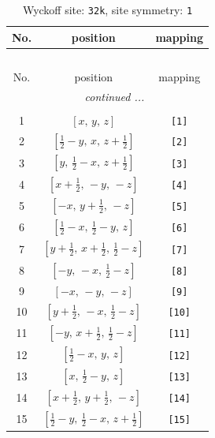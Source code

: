 \documentclass[fleqn,8pt]{jsarticle}
\begin{document}
\renewcommand{\arraystretch}{1.2}
\begin{longtable}{ccc}
\caption{Wyckoff site: {\tt 32k}, site symmetry: {\tt 1}}
 \\
 \hline \hline
No. & position & mapping \\ \hline \endfirsthead

\multicolumn{2}{l}{\tablename\ \thetable{}} \\
 \hline \hline
No. & position & mapping \\ \hline \endhead

 \hline \hline
\multicolumn{2}{r}{\footnotesize\it continued ...} \\ \endfoot

 \hline \hline
\multicolumn{2}{r}{} \\ \endlastfoot

1 & $\left[ x,\, y,\, z \right]$ & {\tt [1]} \\ \hline
2 & $\left[ \frac{1}{2} - y,\, x,\, z + \frac{1}{2} \right]$ & {\tt [2]} \\ \hline
3 & $\left[ y,\, \frac{1}{2} - x,\, z + \frac{1}{2} \right]$ & {\tt [3]} \\ \hline
4 & $\left[ x + \frac{1}{2},\, - y,\, - z \right]$ & {\tt [4]} \\ \hline
5 & $\left[ - x,\, y + \frac{1}{2},\, - z \right]$ & {\tt [5]} \\ \hline
6 & $\left[ \frac{1}{2} - x,\, \frac{1}{2} - y,\, z \right]$ & {\tt [6]} \\ \hline
7 & $\left[ y + \frac{1}{2},\, x + \frac{1}{2},\, \frac{1}{2} - z \right]$ & {\tt [7]} \\ \hline
8 & $\left[ - y,\, - x,\, \frac{1}{2} - z \right]$ & {\tt [8]} \\ \hline
9 & $\left[ - x,\, - y,\, - z \right]$ & {\tt [9]} \\ \hline
10 & $\left[ y + \frac{1}{2},\, - x,\, \frac{1}{2} - z \right]$ & {\tt [10]} \\ \hline
11 & $\left[ - y,\, x + \frac{1}{2},\, \frac{1}{2} - z \right]$ & {\tt [11]} \\ \hline
12 & $\left[ \frac{1}{2} - x,\, y,\, z \right]$ & {\tt [12]} \\ \hline
13 & $\left[ x,\, \frac{1}{2} - y,\, z \right]$ & {\tt [13]} \\ \hline
14 & $\left[ x + \frac{1}{2},\, y + \frac{1}{2},\, - z \right]$ & {\tt [14]} \\ \hline
15 & $\left[ \frac{1}{2} - y,\, \frac{1}{2} - x,\, z + \frac{1}{2} \right]$ & {\tt [15]} \\ \hline

\end{longtable}
\end{document}
